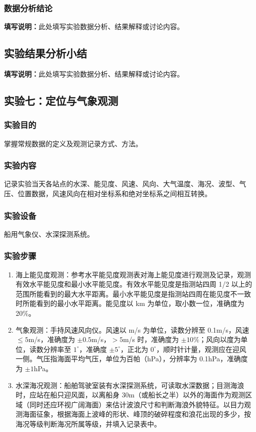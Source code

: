 \documentclass[UTF8,a4paper,12pt]{ctexart}
\begin{document}
\subsubsection{数据分析结论}
\noindent\textbf{填写说明：}此处填写实验数据分析、结果解释或讨论内容。\par
{}
\subsection{实验结果分析小结}
\noindent\textbf{填写说明：}此处填写实验数据分析、结果解释或讨论内容。\par
{}
\subsection{实验七：定位与气象观测}

\subsubsection{实验目的}
掌握常规数据的定义及观测记录方式、方法。

\subsubsection{实验内容}
记录实验当天各站点的水深、能见度、风速、风向、大气温度、海况、波型、气压、位置数据，风速风向在相对坐标系和绝对坐标系之间相互转换。

\subsubsection{实验设备}
船用气象仪、水深探测系统。

\subsubsection{实验步骤}
\begin{enumerate}[label=（\arabic*）]
  \item 海上能见度观测：参考水平能见度观测表对海上能见度进行观测及记录，观测有效水平能见度和最小水平能见度。有效水平能见度是指测站四周 1/2 以上的范围所能看到的最大水平距离。最小水平能见度是指测站四周在能见度不一致时所能看到的最小水平距离。能见度以 km 为单位，取小数一位，准确度为 20\%。
  \item 气象观测：手持风速风向仪。风速以 m/s 为单位，读数分辨至 0.1m/s，风速 \(\leq 5\)m/s，准确度为 \(\pm 0.5\)m/s，\(>5\)m/s 时，准确度为 \(\pm 10\%\)；风向以度为单位，读数分辨率至 \(1^\circ\)，准确度 \(\pm 5^\circ\)，正北为 \(0^\circ\)，顺时针计量，观测应在迎风一侧。气压指海面平均气压，单位为百帕（hPa），分辨率为 0.1hPa，准确度为 \(\pm 1\)hPa。
  \item 水深海况观测：船舶驾驶室装有水深探测系统，可读取水深数据；目测海浪时，应站在船只迎风面，以离船身 30m（或船长之半）以外的海面作为观测区域（同时还应环视广阔海面）来估计波浪尺寸和判断海浪外貌特征。以目力观测海面征象，根据海面上波峰的形状、峰顶的破碎程度和浪花出现的多少，按海况等级判断海况所属等级，并填入记录表中。
\end{enumerate}
\end{document}
